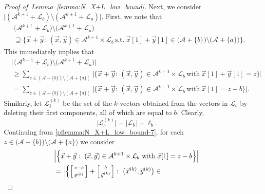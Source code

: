 \documentclass[11pt,draftclsnofoot,onecolumn]{IEEEtran}
\begin{document}
\begin{proof}[Proof of~Lemma~\ref{lemma:N_X+L_low_bound}]
Next, we consider $\big|(\mathcal{A}^{k+1}+\mathcal{L}_{b})
\setminus(\mathcal{A}^{k+1}+\mathcal{L}_{a})\big|$.
First, we note that
\begin{align}
&\big(\mathcal{A}^{k+1}+\mathcal{L}_b\big)\setminus\big(\mathcal{A}^{k+1}+\mathcal{L}_a\big)\nonumber\\
&\supseteq\Big\{\vec{x}+\vec{y}:~(\vec{x},\vec{y})\in\mathcal{A}^{k+1}\times\mathcal{L}_b~\text{s.t.}
~\vec{x}[1]+\vec{y}[1]\in\big(\mathcal{A}+\{b\}\big)\setminus\big(\mathcal{A}+\{a\}\big)\Big\}.\nonumber
\end{align}
This immediately implies that
\begin{align}
&\Big|\big(\mathcal{A}^{k+1}+\mathcal{L}_b\big)\setminus\big(\mathcal{A}^{k+1}+\mathcal{L}_a\big)\Big|\nonumber\\
&\geq\sum_{z\in(\mathcal{A}+\{b\})\setminus(\mathcal{A}+\{a\})}
\Big|\Big\{\vec{x}+\vec{y}:~(\vec{x},\vec{y})\in\mathcal{A}^{k+1}\times\mathcal{L}_b~\text{with}
~\vec{x}[1]+\vec{y}[1]=z\Big\}\Big|\nonumber\\
&=\sum_{z\in(\mathcal{A}+\{b\})\setminus(\mathcal{A}+\{a\})}
\Big|\Big\{\vec{x}+\vec{y}:~(\vec{x},\vec{y})\in\mathcal{A}^{k+1}\times\mathcal{L}_b~\text{with}
~\vec{x}[1]=z-b\Big\}\Big|.\label{pflemma:N_X+L_low_bound-7}
\end{align}
Similarly,
let $\mathcal{L}_{b}^{(k)}$ be the set of the $k$-vectors obtained from the vectors in $\mathcal{L}_{b}$ by deleting their first components, all of which are equal to $b$.
 Clearly,
\begin{equation}
\big|\mathcal{L}_{b}^{(k)}\big|=|\mathcal{L}_{b}|=\ell_{b}.\label{pflemma:N_X+L_low_bound-7.1}
\end{equation}
 Continuing from \eqref{pflemma:N_X+L_low_bound-7},
for each $z\in\big(\mathcal{A}+\{b\}\big)\setminus\big(\mathcal{A}+\{a\}\big)$ we  consider
\begin{align}
&\Big|\Big\{\vec{x}+\vec{y}:~
(\vec{x},\vec{y})\in\mathcal{A}^{k+1}\times\mathcal{L}_{b}~
\text{with}~\vec{x}[1]=z-b\Big\}\Big|\nonumber\\
&=\Big|\Big\{\Big[\begin{smallmatrix}z-b  \vspace{1mm} \\\vec{x}^{(k)}\end{smallmatrix}\Big]+
\Big[\begin{smallmatrix}b \vspace{1mm} \\\vec{y}^{(k)}\end{smallmatrix}\Big]:~\big(\vec{x}^{(k)},\vec{y}^{(k)}\big)\in

\end{align}
\end{proof}
\end{document}
